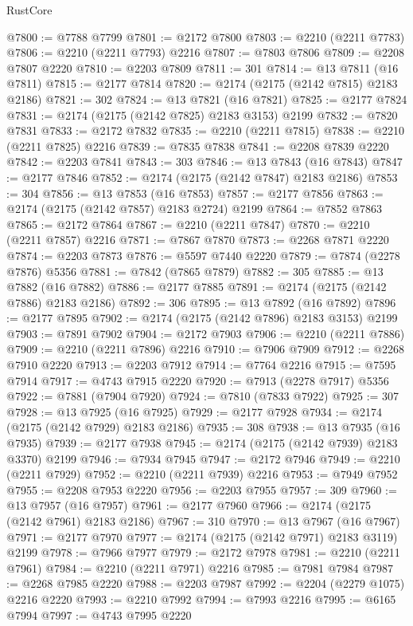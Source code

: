 \begin{lexlean}{RustCore}
\begin{coremodule}
@7800 := @7788 @7799
@7801 := @2172 @7800
@7803 := @2210 (@2211 @7783)
@7806 := @2210 (@2211 @7793) @2216
@7807 := @7803 @7806
@7809 := @2208 @7807 @2220
@7810 := @2203 @7809
@7811 := 301
@7814 := @13 @7811 (@16 @7811)
@7815 := @2177 @7814
@7820 := @2174 (@2175 (@2142 @7815) @2183 @2186)
@7821 := 302
@7824 := @13 @7821 (@16 @7821)
@7825 := @2177 @7824
@7831 := @2174 (@2175 (@2142 @7825) @2183 @3153) @2199
@7832 := @7820 @7831
@7833 := @2172 @7832
@7835 := @2210 (@2211 @7815)
@7838 := @2210 (@2211 @7825) @2216
@7839 := @7835 @7838
@7841 := @2208 @7839 @2220
@7842 := @2203 @7841
@7843 := 303
@7846 := @13 @7843 (@16 @7843)
@7847 := @2177 @7846
@7852 := @2174 (@2175 (@2142 @7847) @2183 @2186)
@7853 := 304
@7856 := @13 @7853 (@16 @7853)
@7857 := @2177 @7856
@7863 := @2174 (@2175 (@2142 @7857) @2183 @2724) @2199
@7864 := @7852 @7863
@7865 := @2172 @7864
@7867 := @2210 (@2211 @7847)
@7870 := @2210 (@2211 @7857) @2216
@7871 := @7867 @7870
@7873 := @2268 @7871 @2220
@7874 := @2203 @7873
@7876 := @5597 @7440 @2220
@7879 := @7874 (@2278 @7876) @5356
@7881 := @7842 (@7865 @7879)
@7882 := 305
@7885 := @13 @7882 (@16 @7882)
@7886 := @2177 @7885
@7891 := @2174 (@2175 (@2142 @7886) @2183 @2186)
@7892 := 306
@7895 := @13 @7892 (@16 @7892)
@7896 := @2177 @7895
@7902 := @2174 (@2175 (@2142 @7896) @2183 @3153) @2199
@7903 := @7891 @7902
@7904 := @2172 @7903
@7906 := @2210 (@2211 @7886)
@7909 := @2210 (@2211 @7896) @2216
@7910 := @7906 @7909
@7912 := @2268 @7910 @2220
@7913 := @2203 @7912
@7914 := @7764 @2216
@7915 := @7595 @7914
@7917 := @4743 @7915 @2220
@7920 := @7913 (@2278 @7917) @5356
@7922 := @7881 (@7904 @7920)
@7924 := @7810 (@7833 @7922)
@7925 := 307
@7928 := @13 @7925 (@16 @7925)
@7929 := @2177 @7928
@7934 := @2174 (@2175 (@2142 @7929) @2183 @2186)
@7935 := 308
@7938 := @13 @7935 (@16 @7935)
@7939 := @2177 @7938
@7945 := @2174 (@2175 (@2142 @7939) @2183 @3370) @2199
@7946 := @7934 @7945
@7947 := @2172 @7946
@7949 := @2210 (@2211 @7929)
@7952 := @2210 (@2211 @7939) @2216
@7953 := @7949 @7952
@7955 := @2208 @7953 @2220
@7956 := @2203 @7955
@7957 := 309
@7960 := @13 @7957 (@16 @7957)
@7961 := @2177 @7960
@7966 := @2174 (@2175 (@2142 @7961) @2183 @2186)
@7967 := 310
@7970 := @13 @7967 (@16 @7967)
@7971 := @2177 @7970
@7977 := @2174 (@2175 (@2142 @7971) @2183 @3119) @2199
@7978 := @7966 @7977
@7979 := @2172 @7978
@7981 := @2210 (@2211 @7961)
@7984 := @2210 (@2211 @7971) @2216
@7985 := @7981 @7984
@7987 := @2268 @7985 @2220
@7988 := @2203 @7987
@7992 := @2204 (@2279 @1075) @2216 @2220
@7993 := @2210 @7992
@7994 := @7993 @2216
@7995 := @6165 @7994
@7997 := @4743 @7995 @2220

\end{coremodule}
\end{lexlean}
